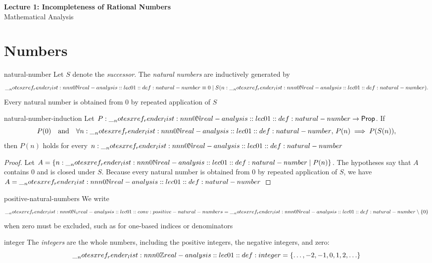 \documentclass[12pt]{article}
\begin{document}
\begin{center}
  {\LARGE\bfseries Lecture 1: Incompleteness of Rational Numbers}\\[0.25em]
  {\large Mathematical Analysis}\\[0.15em]
\end{center}

\section{Numbers}

\begin{dfn}{natural-number}
Let \(S\) denote the \emph{successor}. The \emph{natural numbers} are
inductively generated by
\[
  \NN \defeq 0 \mid S(n:\NN).
\]
Every natural number is obtained from \(0\) by repeated application of \(S\)
\par\smallskip{}
\end{dfn}

\begin{thm}{natural-number-induction}
Let \(P:\NN\to\mathsf{Prop}\). If
\[
  P(0)
  \quad\text{and}\quad
  \forall n: \NN,\, P(n)\implies P(S(n)),
\]
then \(P(n)\) holds for every \(n:\NN\)
\end{thm}

\begin{proof}
Let \(A=\{n:\NN\mid P(n)\}\). The hypotheses say that \(A\)
contains \(0\) and is closed under \(S\). Because every natural number
is obtained from \(0\) by repeated application of \(S\), we have
\(A=\NN\)
\end{proof}

\begin{conv}{positive-natural-numbers}
We write
\[
  \NNOne = \NN \setminus \{0\}
\]
when zero must be excluded, such as for one-based indices or denominators
\par\smallskip{}
\end{conv}

\begin{dfn}[Integers]{integer}
The \emph{integers} are the whole numbers, including the positive integers,
the negative integers, and zero:
\[
  \ZZ=\{\ldots,-2,-1,0,1,2,\ldots\}
\]
\par\smallskip{}
\end{dfn}
\end{document}
